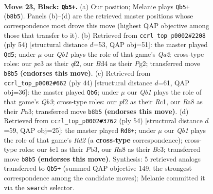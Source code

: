 \documentclass[11pt]{article}
\begin{document}
\clearpage

\begin{figure}[p]\centering
\begin{subfigure}{0.46\textwidth}\centering
\resizebox{\linewidth}{!}{%
\newchessgame
\chessboard[
  setfen={rq6/2p2kpp/3p4/8/pP1b2Q1/2P5/P4PPP/1RB2K2 b - - 0 23},
  showmover=false,
  pgfstyle=straightmove, color=movearrow, markmove={b8-b5}
]}
\caption{}
\end{subfigure}\hfill
\begin{subfigure}{0.46\textwidth}\centering
\resizebox{\linewidth}{!}{%
\newchessgame
\chessboard[
  setfen={2r3k1/pp3ppp/8/B7/P7/3b1P2/Q3BqPP/R6K w - - 2 28},
  showmover=false,
  pgfstyle=straightmove, color=movearrow, markmove={a2-d5}
]}
\caption{}
\end{subfigure}
\\[4pt]
\begin{subfigure}{0.46\textwidth}\centering
\resizebox{\linewidth}{!}{%
\newchessgame
\chessboard[
  setfen={r5k1/1b2qpp1/7p/p7/3p4/PQ2P2P/4BPP1/2R3K1 w - - 0 23},
  showmover=false,
  pgfstyle=straightmove, color=movearrow, markmove={b3-b6}
]}
\caption{}
\end{subfigure}\hfill
\begin{subfigure}{0.46\textwidth}\centering
\resizebox{\linewidth}{!}{%
\newchessgame
\chessboard[
  setfen={4kbQ1/pq3p2/1p2pp2/8/2P4r/1PB5/P2R1P2/6K1 w - - 2 28},
  showmover=false,
  pgfstyle=straightmove, color=movearrow, markmove={d2-d8}
]}
\caption{}
\end{subfigure}
\caption{\textbf{Move 23, Black: \texttt{Qb5+}.} (a) Our position; Melanie plays \texttt{Qb5+} (\texttt{b8b5}). Panels (b)--(d) are the retrieved master positions whose correspondence most drove this move (highest QAP objective among those that transfer to it). (b) Retrieved from \texttt{ccrl\_top\_p0002\#2208} (ply 54) [structural distance $d$=53, QAP obj=51]: the master played \texttt{Qd5}; under $\mu$ our \emph{Qb1} plays the role of that game's \emph{Qa2}; cross-type roles: our \emph{p}c3 as their \emph{q}f2, our \emph{B}d4 as their \emph{P}g2; transferred move \texttt{b8b5} \textbf{(endorses this move)}. (c) Retrieved from \texttt{ccrl\_top\_p0002\#662} (ply 44) [structural distance $d$=61, QAP obj=36]: the master played \texttt{Qb6}; under $\mu$ our \emph{Qb1} plays the role of that game's \emph{Qb3}; cross-type roles: our \emph{p}f2 as their \emph{R}c1, our \emph{R}a8 as their \emph{P}a3; transferred move \texttt{b8b5} \textbf{(endorses this move)}. (d) Retrieved from \texttt{ccrl\_top\_p0002\#3762} (ply 54) [structural distance $d$=59, QAP obj=25]: the master played \texttt{Rd8+}; under $\mu$ our \emph{Qb1} plays the role of that game's \emph{Rd2} (a \textbf{cross-type} correspondence); cross-type roles: our \emph{b}c1 as their \emph{P}b3, our \emph{R}a8 as their \emph{B}c3; transferred move \texttt{b8b5} \textbf{(endorses this move)}. Synthesis: 5 retrieved analogs transferred to \texttt{Qb5+} (summed QAP objective 149, the strongest correspondence among the candidate moves); Melanie committed it via the \texttt{search} selector.}
\label{fig:thought-m45}
\end{figure}
\end{document}
